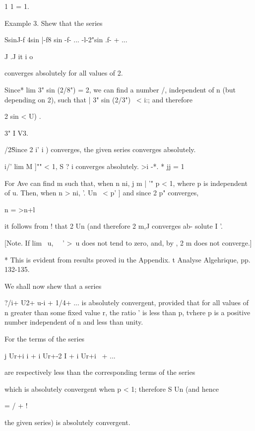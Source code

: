 1 1 = 1.

Example 3. Shew that the series

SsinJ-f 4sin |-f8 sin -f- ... -l-2"sin .f- + ...

 J .J it i o

converges absolutely for all values of 2.

Since* lim 3" sin (2/8") = 2, we can find a number /, independent of
n (but depending on 2), such that | 3" sin (2/3") \ < i:; and
therefore

2 sin < U) .

3" I V3.

  /2\" Since 2 i' i ) converges, the given series converges
absolutely.

\Subsection{2}{3}{5}{Gauchy's test for absolute convergence']'.}

i/' lim M ]"" < 1, S ? i converges absolutely. >i -*. * jj = 1

For Ave can find m such that, when n ni, j m | '" p < 1, where p is
independent of u. Then, when n > ni, '. Un \ < p' ] and since 2 p"
converges,

n = >n+l

it follows from ! that 2 Un (and therefore 2 m,J converges ab-
solute I '.

[Note. If lim \ u, \ \ ' >\, u does not tend to zero, and, by , 2
m does not converge.]

* This is evident from results proved iu the Appendix. t Analyse
Algehrique, pp. 132-135.

%
%


We shall now shew that a series

?/i+ U2+ u-i + 1/4+ ... is absolutely convergent, provided that for
all values of n greater than some fixed value r, the ratio ' is less
than p, tvhere p is a positive number independent of n and less than
unity.

For the terms of the series

j Ur+i i + i Ur+-2 I + i Ur+i \ + ...

are respectively less than the corresponding terms of the series

which is absolutely convergent when p < 1; therefore S Un (and hence

  = / + !

the given series) is absolutely convergent.


